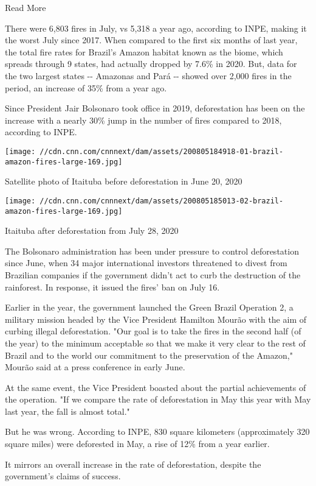 Read More

There were 6,803 fires in July, vs 5,318 a year ago, according to INPE,
making it the worst July since 2017. When compared to the first six
months of last year, the total fire rates for Brazil's Amazon habitat
known as the biome, which spreads through 9 states, had actually dropped
by 7.6\% in 2020. But, data for the two largest states -\/- Amazonas and
Pará -\/- showed over 2,000 fires in the period, an increase of 35\%
from a year ago.

Since President Jair Bolsonaro took office in 2019, deforestation has
been on the increase with a nearly 30\% jump in the number of fires
compared to 2018, according to INPE.

\texttt{[image: //cdn.cnn.com/cnnnext/dam/assets/200805184918-01-brazil-amazon-fires-large-169.jpg]}

Satellite photo of Itaituba before deforestation in June 20, 2020

\texttt{[image: //cdn.cnn.com/cnnnext/dam/assets/200805185013-02-brazil-amazon-fires-large-169.jpg]}

Itaituba after deforestation from July 28, 2020

The Bolsonaro administration has been under pressure to control
deforestation since June, when 34 major international investors
threatened to divest from Brazilian companies if the government didn't
act to curb the destruction of the rainforest. In response, it issued
the fires' ban on July 16.

Earlier in the year, the government launched the Green Brazil Operation
2, a military mission headed by the Vice President Hamilton Mourão with
the aim of curbing illegal deforestation. "Our goal is to take the fires
in the second half (of the year) to the minimum acceptable so that we
make it very clear to the rest of Brazil and to the world our commitment
to the preservation of the Amazon," Mourão said at a press conference in
early June.

At the same event, the Vice President boasted about the partial
achievements of the operation. "If we compare the rate of deforestation
in May this year with May last year, the fall is almost total."

But he was wrong. According to INPE, 830 square kilometers
(approximately 320 square miles) were deforested in May, a rise of 12\%
from a year earlier.

It mirrors an overall increase in the rate of deforestation, despite the
government's claims of success.

